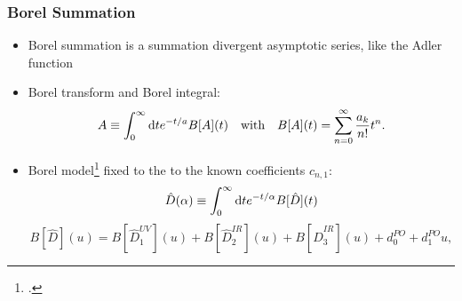 \documentclass{beamer}
\begin{document}
\begin{frame}
  \frametitle{Borel Summation}
  \begin{itemize}
  \item Borel summation is a summation divergent asymptotic series, like the
    Adler function
  \item Borel transform and Borel integral:
    \begin{equation}
      A \equiv \int_0^\infty \dif t e^{-t/a} B[A](t) \quad \text{with} \quad B[A](t) = \sum_{n=0}^\infty \frac{a_k}{n!} t^n.
    \end{equation}
  \item Borel model\footcite{Beneke2008} fixed to the to the known coefficients \(c_{n,1}\):
    \begin{equation}
      \hat D(\alpha) \equiv \int_0^\infty \dif t e^{-t/\alpha} B[\hat D](t)
    \end{equation}
    \begin{equation}
      \label{eq:borelModel}
      B[\widehat D](u) = B[\widehat D_1^{UV}](u) + B[\widehat D_2^{IR}](u) + B[\widehat D_3^{IR}](u) + d_0^{PO} + d_1^{PO}u,
    \end{equation}
  \end{itemize}
\end{frame}
\end{document}
